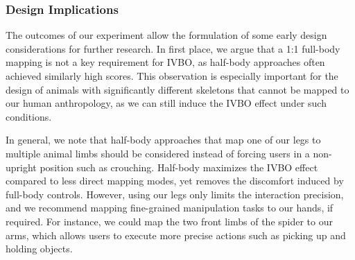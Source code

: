 
%
%
%
%

\subsubsection{Design Implications} The outcomes of our experiment allow the formulation of some early design considerations for further research. In first place, we argue that a 1:1 full-body mapping is not a key requirement for IVBO, as half-body approaches often achieved similarly high scores. This observation is especially important for the design of animals with significantly different skeletons that cannot be mapped to our human anthropology, as we can still induce the IVBO effect under such conditions. 

In general, we note that half-body approaches that map one of our legs to multiple animal limbs should be considered instead of forcing users in a non-upright position such as crouching. Half-body maximizes the IVBO effect compared to less direct mapping modes, yet removes the discomfort induced by full-body controls. However, using our legs only limits the interaction precision, and we recommend mapping fine-grained manipulation tasks to our hands, if required. For instance, we could map the two front limbs of the spider to our arms, which allows users to execute more precise actions such as picking up and holding objects.

